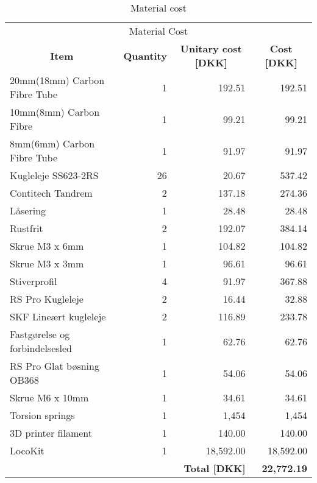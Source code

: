 \begin{table}[htbp]
\caption{Material cost}
\centering
\begin{tabular}{l|r|r|r}
\multicolumn{4}{c}{\Large Material Cost} \\
\multicolumn{1}{c|}{\textbf{Item}} & \multicolumn{1}{c|}{\textbf{Quantity}} & \multicolumn{1}{c|}{\textbf{Unitary cost [DKK]}} & \multicolumn{1}{c}{\textbf{Cost [DKK]}} \\ \hline
20mm(18mm) Carbon Fibre Tube & 1 & 192.51 & 192.51 \\ \hline
10mm(8mm) Carbon Fibre & 1 & 99.21 & 99.21 \\ \hline
8mm(6mm) Carbon Fibre Tube & 1 & 91.97 & 91.97 \\ \hline
Kugleleje SS623-2RS & 26 & 20.67 & 537.42 \\ \hline
Contitech Tandrem & 2 & 137.18 & 274.36 \\ \hline
Låsering & 1 & 28.48 & 28.48 \\ \hline
Rustfrit & 2 & 192.07 & 384.14 \\ \hline
Skrue M3 x 6mm & 1 & 104.82 & 104.82 \\ \hline
Skrue M3 x 3mm & 1 & 96.61 & 96.61 \\ \hline
Stiverprofil & 4 & 91.97 & 367.88 \\ \hline
RS Pro Kugleleje & 2 & 16.44 & 32.88 \\ \hline
SKF Lineært kugleleje & 2 & 116.89 & 233.78 \\ \hline
Fastgørelse og forbindelsesled & 1 & 62.76 & 62.76 \\ \hline
RS Pro Glat bøsning OB368 & 1 & 54.06 & 54.06 \\ \hline
Skrue M6 x 10mm & 1 & 34.61 & 34.61 \\ \hline
Torsion springs & 1 & 1,454 & 1,454 \\ \hline
3D printer filament & 1 & 140.00 & 140.00 \\ \hline
LocoKit  & 1 & 18,592.00 & 18,592.00 \\ \hline
\multicolumn{2}{l}{} & \textbf{Total [DKK]} & \textbf{22,772.19} \\
\end{tabular}
\label{tab:material_cost}
\end{table}


